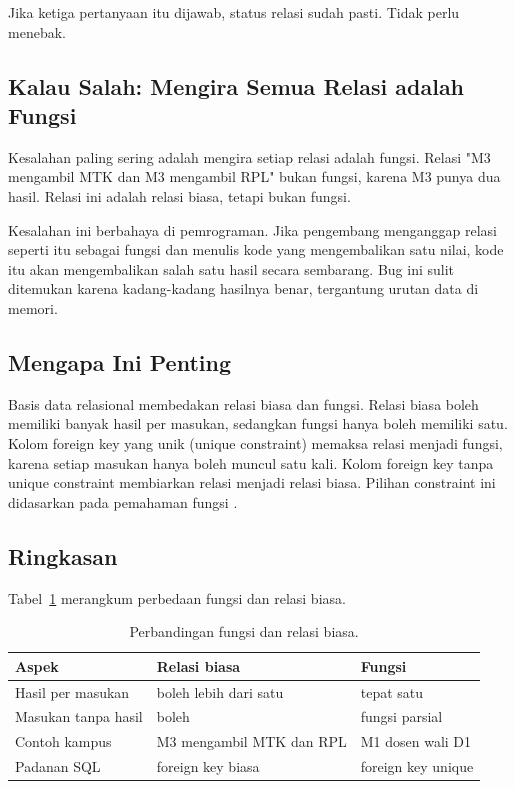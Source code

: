 \documentclass[11pt,a4paper]{article}
\begin{document}
Jika ketiga pertanyaan itu dijawab, status relasi sudah pasti. Tidak perlu menebak.

\subsection{Kalau Salah: Mengira Semua Relasi adalah Fungsi}

Kesalahan paling sering adalah mengira setiap relasi adalah fungsi. Relasi "M3 mengambil MTK dan M3 mengambil RPL" bukan fungsi, karena M3 punya dua hasil. Relasi ini adalah relasi biasa, tetapi bukan fungsi.

Kesalahan ini berbahaya di pemrograman. Jika pengembang menganggap relasi seperti itu sebagai fungsi dan menulis kode yang mengembalikan satu nilai, kode itu akan mengembalikan salah satu hasil secara sembarang. Bug ini sulit ditemukan karena kadang-kadang hasilnya benar, tergantung urutan data di memori.

\subsection{Mengapa Ini Penting}

Basis data relasional membedakan relasi biasa dan fungsi. Relasi biasa boleh memiliki banyak hasil per masukan, sedangkan fungsi hanya boleh memiliki satu. Kolom foreign key yang unik (unique constraint) memaksa relasi menjadi fungsi, karena setiap masukan hanya boleh muncul satu kali. Kolom foreign key tanpa unique constraint membiarkan relasi menjadi relasi biasa. Pilihan constraint ini didasarkan pada pemahaman fungsi \cite{silberschatz}.

\subsection{Ringkasan}

Tabel~\ref{tab:fungsi-relasi} merangkum perbedaan fungsi dan relasi biasa.

\begin{table}[H]
	\centering
	\caption{Perbandingan fungsi dan relasi biasa.}
	\label{tab:fungsi-relasi}
	\small
	\begin{tabularx}{\textwidth}{l X X}
		\toprule
		Aspek               & Relasi biasa             & Fungsi             \\
		\midrule
		Hasil per masukan   & boleh lebih dari satu    & tepat satu         \\
		Masukan tanpa hasil & boleh                    & fungsi parsial     \\
		Contoh kampus       & M3 mengambil MTK dan RPL & M1 dosen wali D1   \\
		Padanan SQL         & foreign key biasa        & foreign key unique \\
		\bottomrule
	\end{tabularx}
\end{table}
\end{document}

